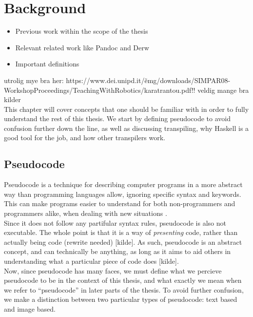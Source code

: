 \chapter{Background} %
\begin{itemize}
    \item Previous work within the scope of the thesis
    \item Relevant related work like Pandoc and Derw
    \item Important definitions
\end{itemize}

utrolig mye bra her: https://www.dei.unipd.it/\~emg/downloads/SIMPAR08-WorkshopProceedings/TeachingWithRobotics/karatrantou.pdf!! veldig mange bra kilder \hfill \\

This chapter will cover concepts that one should be familiar with in order to fully understand the rest of this thesis. We start by defining pseudocode to avoid confusion further down the line, as well as discussing transpiling, why Haskell is a good tool for the job, and how other transpilers work.

\section{Pseudocode}

Pseudocode is a technique for describing computer programs in a more abstract way than programming languages allow, ignoring specific syntax and keywords. This can make programs easier to understand for both non-programmers and programmers alike, when dealing with new situations \cite{LinfoAlgorithmsIntro2007}. \hfill \\

Since it does not follow any partifular syntax rules, pseudocode is also not executable. The whole point is that it is a way of \textit{presenting} code, rather than actually being code (rewrite needed) [kilde]. As such, pseudocode is an abstract concept, and can technically be anything, as long as it aims to aid others in understanding what a particular piece of code does [kilde]. \hfill \\

Now, since pseudocode has many faces, we must define what we percieve pseudocode to be in the context of this thesis, and what exactly we mean when we refer to ``pseudocode'' in later parts of the thesis. To avoid further confusion, we make a distinction between two particular types of pseudocode: text based and image based.

